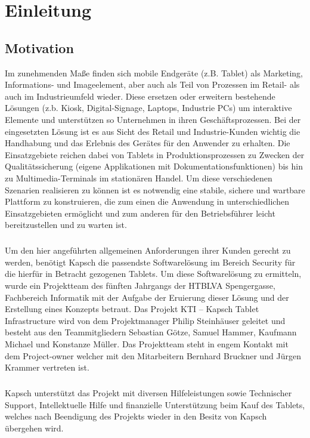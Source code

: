 \chapter{Einleitung}
\section{Motivation}
Im zunehmenden Maße finden sich mobile Endgeräte (z.B. Tablet) als Marketing, Informations- und Imageelement, aber auch als Teil von Prozessen im Retail- als auch im Industrieumfeld wieder. Diese ersetzen oder erweitern bestehende Lösungen (z.b. Kiosk, Digital-Signage, Laptops, Industrie PCs) um interaktive Elemente und unterstützen so Unternehmen in ihren Geschäftsprozessen. 
Bei der eingesetzten Lösung ist es aus Sicht des Retail und Industrie-Kunden wichtig die Handhabung und das Erlebnis des Gerätes für den Anwender zu erhalten. Die Einsatzgebiete reichen dabei von Tablets in Produktionsprozessen zu Zwecken der Qualitätssicherung (eigene Applikationen mit Dokumentationsfunktionen) bis hin zu Multimedia-Terminals im stationären Handel. Um diese verschiedenen Szenarien realisieren zu können ist es notwendig eine stabile, sichere und wartbare Plattform zu konstruieren, die zum einen die Anwendung in unterschiedlichen Einsatzgebieten ermöglicht und zum anderen für den Betriebsführer leicht bereitzustellen und zu warten ist.
\paragraph*{}
Um den hier angeführten allgemeinen Anforderungen ihrer Kunden gerecht zu werden, benötigt Kapsch die passendste Softwarelösung im Bereich Security für die hierfür in Betracht gezogenen Tablets. Um diese Softwarelösung zu ermitteln, wurde ein Projektteam des fünften Jahrgangs der HTBLVA Spengergasse, Fachbereich Informatik mit der Aufgabe der Eruierung dieser Lösung und  der Erstellung eines Konzepts betraut. Das Projekt KTI – Kapsch Tablet Infrastructure wird von dem Projektmanager Philip Steinhäuser geleitet  und besteht aus den Teammitgliedern Sebastian Götze, Samuel Hammer, Kaufmann Michael und Konstanze Müller. Das Projektteam steht in engem Kontakt mit dem Project-owner welcher mit den Mitarbeitern Bernhard Bruckner und Jürgen Krammer vertreten ist. 
\paragraph*{}
Kapsch unterstützt das Projekt mit diversen Hilfeleistungen sowie Technischer Support, Intellektuelle Hilfe und finanzielle Unterstützung beim Kauf des Tablets, welches nach Beendigung des Projekts wieder in den Besitz von Kapsch übergehen wird.


